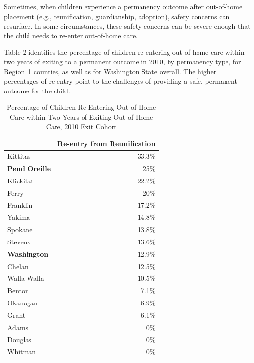 \documentclass{article}\usepackage[]{graphicx}\usepackage[]{color}
\begin{document}
Sometimes, when children experience a permanency outcome after out-of-home placement (e.g., reunification, guardianship, adoption), safety concerns can resurface. In some circumstances, these safety concerns can be severe enough that the child needs to re-enter out-of-home care.

Table 2 identifies the percentage of children re-entering out-of-home care within two years of exiting to a permanent outcome in 2010, by permanency type, for Region~1 counties, as well as for Washington State overall. The higher percentages of re-entry point to the challenges of providing a safe, permanent outcome for the child.
\vspace{12pt}
\nopagebreak[3]
\begin{table}[ht]
\centering
\caption{Percentage of Children Re-Entering Out-of-Home Care within Two Years of Exiting Out-of-Home Care, 2010 Exit Cohort} 
\begin{tabular}{lr}
  \toprule
 & Re-entry from Reunification \\ 
  \midrule
Kittitas & 33.3\% \\ 
  \textbf{Pend Oreille} & 25\% \\ 
  Klickitat & 22.2\% \\ 
  Ferry & 20\% \\ 
  Franklin & 17.2\% \\ 
  Yakima & 14.8\% \\ 
  Spokane & 13.8\% \\ 
  Stevens & 13.6\% \\ 
  \textbf{Washington} & 12.9\% \\ 
  Chelan & 12.5\% \\ 
  Walla Walla & 10.5\% \\ 
  Benton & 7.1\% \\ 
  Okanogan & 6.9\% \\ 
  Grant & 6.1\% \\ 
  Adams & 0\% \\ 
  Douglas & 0\% \\ 
  Whitman & 0\% \\ 
   \bottomrule
\end{tabular}
\end{table}



\newpage

\end{document}
